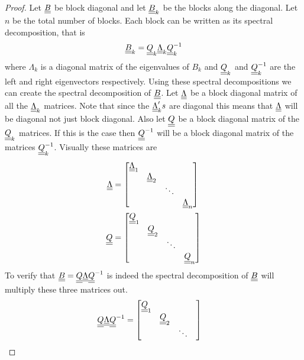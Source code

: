 \documentclass[11pt, oneside]{article}
\begin{document}
\begin{enumerate}
    \begin{proof}
      Let $\underline{\underline{B}}$ be block diagonal and let $\underline{\underline{B}}_k$ be the blocks along the diagonal.
      Let $n$ be the total number of blocks.
      Each block can be written as its spectral decomposition, that is
      \[
        \underline{\underline{B}}_k = \underline{\underline{Q}}_k \underline{\underline{\Lambda}}_k \underline{\underline{Q}}_k^{-1}
      \]
      where $\Lambda_k$ is a diagonal matrix of the eigenvalues of $B_k$ and
      $\underline{\underline{Q}}_k$ and $\underline{\underline{Q}}_k^{-1}$ are the left and right eigenvectors
      respectively.
      Using these spectral decompositions we can create the spectral
      decomposition of $\underline{\underline{B}}$.
      Let $\underline{\underline{\Lambda}}$ be a block diagonal matrix of all the $\underline{\underline{\Lambda}}_k$
      matrices.
      Note that since the $\underline{\underline{\Lambda}}_k's$ are diagonal this means that
      $\underline{\underline{\Lambda}}$ will be diagonal not just block diagonal.
      Also let $\underline{\underline{Q}}$ be a block diagonal matrix of the $\underline{\underline{Q}}_k$ matrices.
      If this is the case then $\underline{\underline{Q}}^{-1}$ will be a block diagonal matrix
      of the matrices $\underline{\underline{Q}}_k^{-1}$.
      Visually these matrices are
      \begin{align*}
        \underline{\underline{\Lambda}} &=
        \begin{bmatrix}
          \underline{\underline{\Lambda}}_1 & & & \\
          & \underline{\underline{\Lambda}}_2 & & \\
          & & \ddots & \\
          & & & \underline{\underline{\Lambda}}_n \\
        \end{bmatrix} \\
        \underline{\underline{Q}} &=
        \begin{bmatrix}
          \underline{\underline{Q}}_1 & & & \\
          & \underline{\underline{Q}}_2 & & \\
          & & \ddots & \\
          & & & \underline{\underline{Q}}_n \\
        \end{bmatrix} \\
      \end{align*}
      To verify that $\underline{\underline{B}} = \underline{\underline{Q}} \underline{\underline{\Lambda}} \underline{\underline{Q}}^{-1}$ is indeed the
      spectral decomposition of $\underline{\underline{B}}$ will multiply these three matrices out.
      \begin{align*}
        \underline{\underline{Q}} \underline{\underline{\Lambda}} \underline{\underline{Q}}^{-1} &= 
        \begin{bmatrix}
          \underline{\underline{Q}}_1 & & & \\
          & \underline{\underline{Q}}_2 & & \\
          & & \ddots & \\

\end{bmatrix}
\end{align*}
\end{proof}
\end{enumerate}
\end{document}
